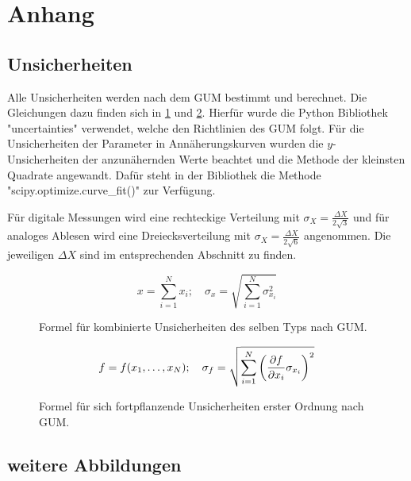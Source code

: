 \newpage
\appendix
\section{Anhang}\label{sec:anhang}

\subsection{Unsicherheiten}\label{sec:unsicherheiten}

Alle Unsicherheiten werden nach dem GUM bestimmt und berechnet.
Die Gleichungen dazu finden sich in \ref{fig:GUM_combine} und \ref{fig:GUM_formula}.
Hierfür wurde die Python Bibliothek "uncertainties" verwendet, welche den Richtlinien des GUM folgt.
Für die Unsicherheiten der Parameter in Annäherungskurven wurden die $y$-Unsicherheiten der anzunähernden Werte beachtet und die Methode der kleinsten Quadrate angewandt.
Dafür steht in der Bibliothek die Methode "scipy.optimize.curve\_fit()" zur Verfügung.

Für digitale Messungen wird eine rechteckige Verteilung mit $\sigma_X = \frac{\Delta X}{2\sqrt{3}}$ und für analoges Ablesen wird eine Dreiecksverteilung mit $\sigma_X = \frac{\Delta X}{2\sqrt{6}}$ angenommen.
Die jeweiligen $\Delta X$ sind im entsprechenden Abschnitt zu finden.

\begin{figure}[ht]
	\begin{equation*}
	x = \sum_{i=1}^{N} x_i
	;\quad
	\sigma_x = \sqrt{\sum_{i = 1}^{N} \sigma_{x_i}^2}
	\end{equation*}
	\caption{Formel für kombinierte Unsicherheiten des selben Typs nach GUM.}
	\label{fig:GUM_combine}
\end{figure}

\begin{figure}[ht]
	\begin{align*}
	f = f(x_1, \dots , x_N)
	;\quad
	\sigma_f = \sqrt{\sum_{i = 1}^{N}\left(\pdv{f}{x_i} \sigma_{x_i}\right) ^2}
	\end{align*}
	\caption{Formel für sich fortpflanzende Unsicherheiten erster Ordnung nach GUM.}
	\label{fig:GUM_formula}
\end{figure}

\newpage
\subsection{weitere Abbildungen}


